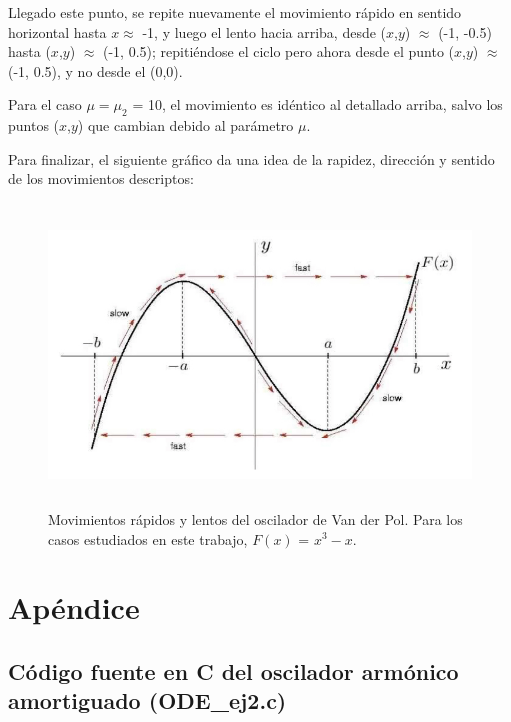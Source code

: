 \documentclass[a4paper,12pt]{article}
\begin{document}
\begin{itemize}
Llegado este punto, se repite nuevamente el movimiento r\'apido en sentido horizontal hasta $x \approx$ -1, y luego el lento hacia arriba, desde ($x$,$y$) $\approx$ (-1, -0.5) hasta ($x$,$y$) $\approx$ (-1, 0.5); repiti\'endose el ciclo pero ahora desde el punto ($x$,$y$) $\approx$ (-1, 0.5), y no desde el (0,0).

Para el caso $\mu = \mu_2$ = 10, el movimiento es id\'entico al detallado arriba, salvo los puntos ($x$,$y$) que cambian debido al par\'ametro $\mu$.

Para finalizar, el siguiente gr\'afico da una idea de la rapidez, direcci\'on y sentido de los movimientos descriptos:


\begin{figure}[H]
\begin{center}
\includegraphics[height=8cm]{grafico_movimientos.jpg}
\caption[width=5cm]{Movimientos r\'apidos y lentos del oscilador de Van der Pol. Para los casos estudiados en este trabajo, $F(x)$ = $x^3 - x$.}
\end{center}
\end{figure}


\end{itemize}

\section{Ap\'endice}

\subsection{C\'odigo fuente en C del oscilador arm\'onico amortiguado (ODE\_ej2.c)}


\end{document}
